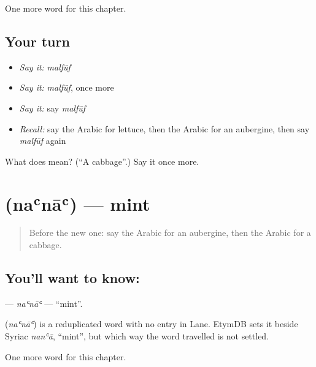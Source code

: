 \begin{grammarlens}[title={What you've built}]
One more word for this chapter.
\end{grammarlens}

\subsection*{Your turn}
\begin{itemize}
\raggedright
  \item \emph{Say it:} \emph{malfūf}
  \item \emph{Say it:} \emph{malfūf}, once more
  \item \emph{Say it:} say \emph{malfūf}
  \item \emph{Recall:} say the Arabic for lettuce, then the Arabic for an aubergine, then say \emph{malfūf} again
\end{itemize}

\begin{tcolorbox}[breakable,colback=teal!4,colframe=teal!35!black,title={Before you move on}]
What does  mean? (\textquotedblleft{}A cabbage\textquotedblright{}.) Say it once more.
\end{tcolorbox}
\section[\texorpdfstring{\ar{نعناع} (naʿnāʿ)}{نعناع (naʿnāʿ)}]{ (naʿnāʿ) — mint}

\label{lesson:AR-C121-nana}



\begin{quote}
Before the new one: say the Arabic for an aubergine, then the Arabic for a cabbage.
\end{quote}

\subsection*{You'll want to know: }
\textbf{} — \emph{naʿnāʿ} — \textquotedblleft{}mint\textquotedblright{}.

\begin{cousinweb}
\textbf{} (\emph{naʿnāʿ}) is a reduplicated word with no entry in Lane. EtymDB sets it beside Syriac \emph{nanʿā}, \textquotedblleft{}mint\textquotedblright{}, but which way the word travelled is not settled.
\end{cousinweb}

\begin{grammarlens}[title={What you've built}]
One more word for this chapter.
\end{grammarlens}


